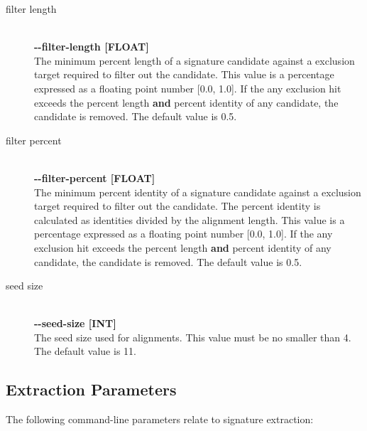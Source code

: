 \documentclass[a4paper,10pt]{article}
\begin{document}
\begin{description}

  \item[filter length] \hfill \\
  \textbf{-{}-filter-length [FLOAT]} \hfill \\
  The minimum percent length of a signature candidate against a exclusion target required to filter out the candidate. This value is a percentage expressed as a floating point number [0.0, 1.0]. If the any exclusion hit exceeds the percent length \textbf{and} percent identity of any candidate, the candidate is removed. The default value is 0.5.
  
  \item[filter percent] \hfill \\
  \textbf{-{}-filter-percent [FLOAT]} \hfill \\
  The minimum percent identity of a signature candidate against a exclusion target required to filter out the candidate. The percent identity is calculated as identities divided by the alignment length. This value is a percentage expressed as a floating point number [0.0, 1.0]. If the any exclusion hit exceeds the percent length \textbf{and} percent identity of any candidate, the candidate is removed. The default value is 0.5.
  
  \item[seed size] \hfill \\
  \textbf{-{}-seed-size [INT]} \hfill \\
  The seed size used for alignments. This value must be no smaller than 4. The default value is 11.
  
\end{description}
  
\subsection{Extraction Parameters}

The following command-line parameters relate to signature extraction:
\end{document}
